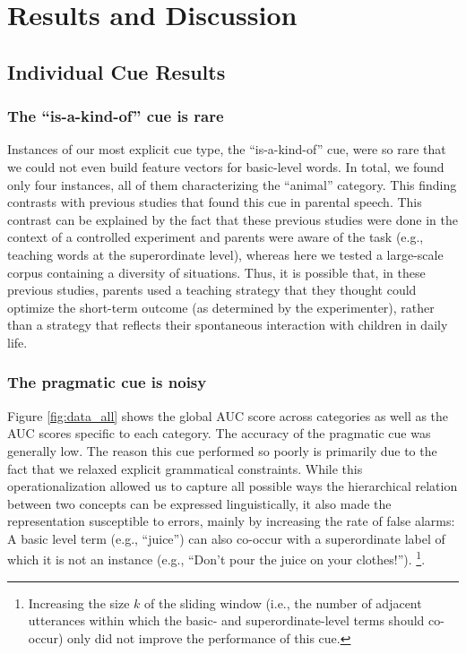 \documentclass[10pt, letterpaper]{article}
\begin{document}
\hypertarget{results-and-discussion}{%
\section{Results and Discussion}\label{results-and-discussion}}

\subsection{Individual Cue Results}

\hypertarget{the-is-a-kind-of-cue-is-rare}{%
\subsubsection{The ``is-a-kind-of'' cue is
rare}\label{the-is-a-kind-of-cue-is-rare}}

Instances of our most explicit cue type, the ``is-a-kind-of'' cue, were so rare that we could not even build feature vectors for basic-level words. In total, we found only four instances, all of them characterizing the ``animal'' category.
This finding contrasts with previous studies that found this cue in parental
speech. %
This contrast can be explained by the fact that these previous
studies were done in the context of a controlled experiment and parents
were aware of the task (e.g., teaching words at the superordinate
level), whereas here we tested a large-scale corpus containing a
diversity of situations. Thus, it is possible that, in these previous
studies, parents used a teaching strategy that they thought could
optimize the short-term outcome (as determined by the experimenter),
rather than a strategy that reflects their spontaneous interaction with
children in daily life.

\hypertarget{the-pragmatic-cue-is-noisy}{%
\subsubsection{The pragmatic cue is
noisy}\label{the-pragmatic-cue-is-noisy}}

Figure \ref{fig:data_all} shows the global AUC score across categories as well as the AUC
scores specific to each category. The accuracy of the pragmatic cue was
generally low. The reason this cue performed so poorly is primarily due
to the fact that we relaxed explicit grammatical constraints. While this
operationalization allowed us to capture all possible ways the
hierarchical relation between two concepts can be expressed
linguistically, it also made the representation susceptible to errors,
mainly by increasing the rate of false alarms: A basic level term (e.g.,
``juice'') can also co-occur with a superordinate label of which it is
not an instance (e.g., ``Don't pour the juice on your clothes!'').
\footnote{Increasing the size $k$ of the sliding window (i.e., the number
of adjacent utterances within which the basic- and superordinate-level
terms should co-occur) only did not improve the performance of this cue.}.
\end{document}
